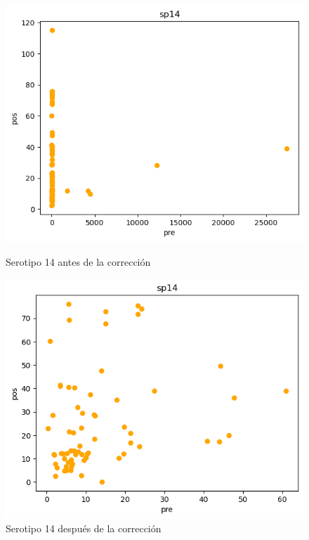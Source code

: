 \begin{figure}[H]
    \begin{minipage}{0.45\textwidth}
        \centering
        \includegraphics[width=\linewidth]{Graphics/sp14d.png}
        \caption{Serotipo 14 antes de la corrección}
        \label{fig:sp14d}
    \end{minipage}%
    \hfill
    \begin{minipage}{0.45\textwidth}
        \centering
        \includegraphics[width=\linewidth]{Graphics/sp14.png}
        \caption{Serotipo 14 después de la corrección}
        \label{fig:sp14}
    \end{minipage}
\end{figure}

